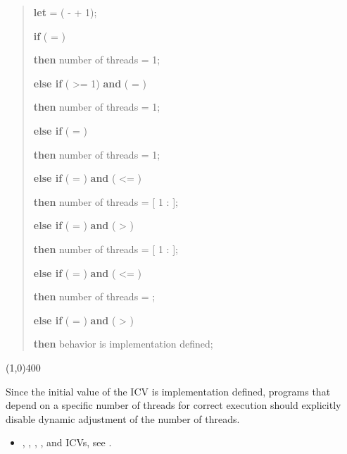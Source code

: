 \begin{samepage}
\begin{quote}
\textbf{let}  = ( -  + 1);

\textbf{if} ( = )

\textbf{then} number of threads = 1;

\textbf{else if} ( >= 1) \textbf{and} ( = )

\textbf{then} number of threads = 1;

\textbf{else if} ( = )

\textbf{then} number of threads = 1;

\textbf{else if} ( = ) \textbf{and} ( <= )

\textbf{then} number of threads = [ 1 :  ];

\textbf{else if} ( = ) \textbf{and} ( > )

\textbf{then} number of threads = [ 1 :  ];

\textbf{else if} ( = ) \textbf{and} ( <= )

\textbf{then} number of threads = ;

\textbf{else if} ( = ) \textbf{and} ( > )

\textbf{then} behavior is implementation defined;
\end{quote}

\nolinenumbers\line(1,0){400}\linenumbers
\end{samepage}
\bigskip

\begin{note}
Since the initial value of the  ICV is implementation defined, programs
that depend on a specific number of threads for correct execution should explicitly
disable dynamic adjustment of the number of threads.
\end{note}

\crossreferences
\begin{itemize}
\item {}, , ,
, and  ICVs, see
.
\end{itemize}










